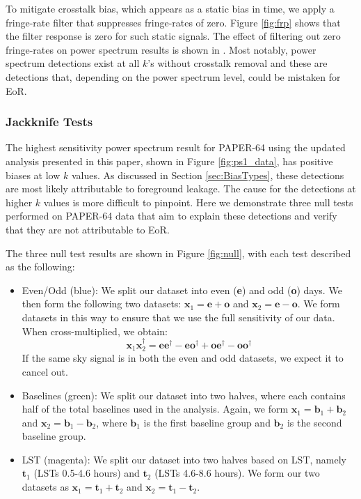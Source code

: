 \documentclass[preprint2,numberedappendix,tighten]{aastex6}  %
\begin{document}
To mitigate crosstalk bias, which appears as a static bias in time, we apply a fringe-rate filter that suppresses fringe-rates of 
zero. Figure \ref{fig:frp} shows that the filter response is zero for such static signals. The effect of filtering out zero fringe-rates 
on power spectrum results is shown in . Most notably, power spectrum detections exist at all $k$'s without crosstalk 
removal and these are detections that, depending on the power spectrum level, could be mistaken for EoR. 

\subsubsection{Jackknife Tests}

The highest sensitivity power spectrum result for PAPER-64 using the updated analysis presented in this paper, shown in 
Figure \ref{fig:ps1_data}, has positive biases at low $k$ values. As discussed in Section \ref{sec:BiasTypes}, these detections 
are most likely attributable to foreground leakage. The cause for the detections at higher $k$ values is more difficult to pinpoint. Here we demonstrate three null tests performed on PAPER-64 data that aim to explain these detections and verify 
that they are not attributable to EoR.

The three null test results are shown in Figure \ref{fig:null}, with each test described as the following:

\begin{itemize}
\item Even/Odd (blue): We split our dataset into even (\textbf{e}) and odd (\textbf{o}) days. We then form the following two datasets: $\textbf{x}_{1} = \textbf{e} + \textbf{o}$ and $\textbf{x}_{2} = 
\textbf{e} - \textbf{o}$. We form datasets in this way to ensure that we use the full sensitivity of our data. When cross-multiplied, we obtain:
\begin{equation}
\textbf{x}_{1}\textbf{x}_{2}^{\dagger} = \textbf{ee}^{\dagger} - \textbf{eo}^{\dagger} + \textbf{oe}^{\dagger} - \textbf{oo}^{\dagger}
\end{equation}
If the same sky signal is in both the even and odd datasets, we expect it to cancel out.
\item Baselines (green): We split our dataset into two halves, where each contains half of the total baselines used in the 
analysis. Again, we form $\textbf{x}_{1} = \textbf{b}_{1} + \textbf{b}_{2}$ and $\textbf{x}_{2} = \textbf{b}_{1} - \textbf{b}_{2}$, where $\textbf{b}_{1}$ is the first baseline 
group and $\textbf{b}_{2}$ is the second baseline group.
\item LST (magenta): We split our dataset into two halves based on LST, namely $\textbf{t}_{1}$ (LSTs 0.5-4.6 hours) and $\textbf{t}_{2}$ (LSTs 
4.6-8.6 hours). We form our two datasets as $\textbf{x}_{1} = \textbf{t}_{1} + \textbf{t}_{2}$ and $\textbf{x}_{2} = \textbf{t}_{1} -\textbf{t}_{2}$.
\end{itemize}
\end{document}

